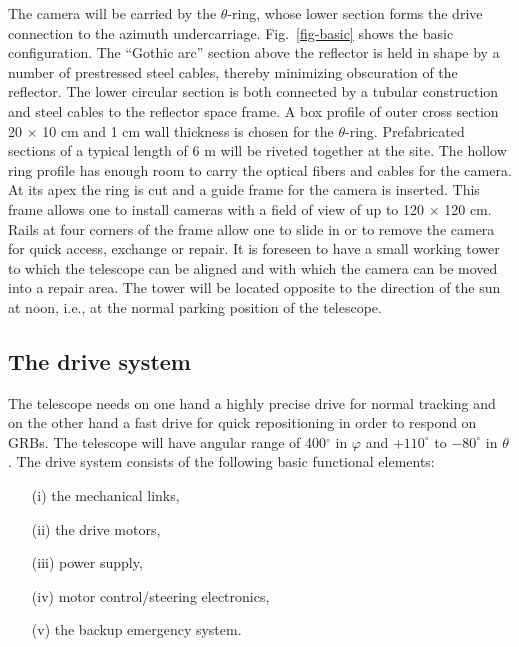 
\medskip The camera will be carried by the $\theta$-ring, whose lower
section forms the drive connection to the azimuth undercarriage.
Fig.~\ref{fig-basic} shows the basic configuration. The ``Gothic arc'' section above
the reflector is held in shape by a number of prestressed steel cables, thereby
minimizing obscuration of the reflector. The lower circular section is both
connected by a tubular construction and steel cables to the reflector space
frame. A box profile of outer cross section 20 $\times$ 10 cm and 1 cm wall
thickness is chosen for the $\theta$-ring. Prefabricated sections of a
typical length of 6 m will be riveted together at the site. The hollow ring
profile has enough room to carry the optical fibers and cables for the
camera. At its apex the ring is cut  and a guide frame for
the camera is inserted. This frame allows one to install cameras with a
field of view of up to 120 $\times$ 120 cm. Rails at four corners of the
frame allow one to slide in or to remove the camera for quick access,
exchange or repair. It is foreseen to have a small working tower to which
the telescope can be aligned and with which the camera can be moved into a
repair area. The tower will be located opposite to the direction of the sun
at noon, i.e., at the normal parking position of the telescope.

\subsection{The drive system}


\medskip The telescope needs on one hand a highly precise drive for normal
tracking and on the other hand a fast drive for quick repositioning in order
to respond on GRBs. The telescope will have angular range of 400$^\circ$ in $%
\varphi$ and $+110^\circ$ to $-80^\circ$ in $\theta$. The drive system
consists of the following basic functional elements:

\begin{itemize}
\item[(i)]  the mechanical links,

\item[(ii)]  the drive motors,

\item[(iii)]  power supply,

\item[(iv)]  motor control/steering electronics,

\item[(v)]  the backup emergency system.
\end{itemize}

